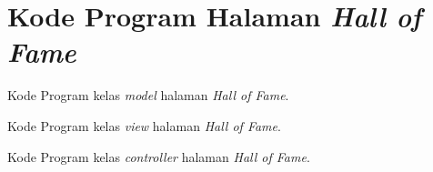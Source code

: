 \chapter{Kode Program Halaman \textit{Hall of Fame}}
\label{lamp:kodeprogramhalamanhof}

Kode Program kelas \textit{model} halaman \textit{Hall of Fame}.
 

Kode Program kelas \textit{view} halaman \textit{Hall of Fame}.
 

Kode Program kelas \textit{controller} halaman \textit{Hall of Fame}.
